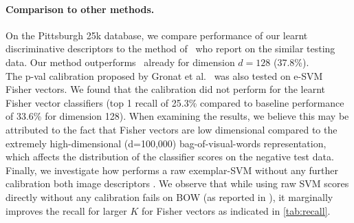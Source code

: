 \documentclass[10pt,twocolumn,letterpaper]{article}
\begin{document}
      \paragraph{Comparison to other methods.}
         \textcolor{petr}{
         On the Pittsburgh 25k database, we compare performance of our learnt discriminative descriptors to the method of~\cite{Gronat13} who report on the similar testing data. Our method outperforms~\cite{Gronat13} already for dimension $d=128$ (37.8\%).
         \\
         The p-val calibration proposed by Gronat et al.~\cite{Gronat13} was also tested on e-SVM Fisher vectors. We found that the calibration did not perform for the learnt Fisher vector classifiers (top 1 recall of 25.3\% compared to baseline performance of 33.6\% for dimension 128). When examining the results, we believe this may be attributed to the fact that Fisher vectors are low dimensional compared to the extremely high-dimensional (d=100,000) bag-of-visual-words representation, which affects the distribution of the classifier scores on the negative test data.
         \\
         Finally, we investigate how performs a raw exemplar-SVM without any further calibration both image descriptors . We observe that while using raw SVM scores directly without any calibration fails on BOW (as reported in \cite{Gronat13}), it marginally improves the recall for larger $K$ for Fisher vectors as indicated in \ref{tab:recall}.
        }
\end{document}
